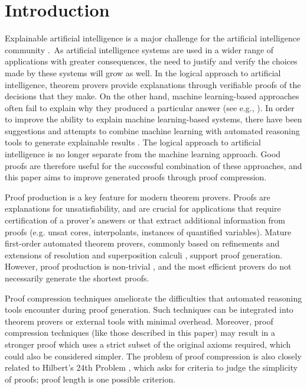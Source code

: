 \section{Introduction} 


Explainable artificial intelligence is a major challenge for the artificial intelligence community \cite{bonacina2017automated}.~As artificial intelligence systems are used in a wider range of applications with greater consequences, the need to justify and verify the choices made by these systems will grow as well.
In the logical approach to artificial intelligence, theorem provers provide explanations through verifiable proofs of the decisions that they make.
On the other hand, machine learning-based approaches often fail to explain why they produced a particular answer (see e.g., \cite{miller2019explanation}). 
In order to improve the ability to explain machine learning-based systems, there have been suggestions and attempts to combine machine learning with automated reasoning tools to generate explainable results \cite{bonacina2017automated,siebert2019corg}. 
The logical approach to artificial intelligence is no longer separate from the machine learning approach.
Good proofs are therefore useful for the successful combination of these approaches, and this paper aims to improve generated proofs through proof compression.

Proof production is a key feature for modern theorem provers. 
Proofs are explanations for unsatisfiability, and are crucial for applications that require certification of a prover's answers or that extract additional information from proofs (e.g. unsat cores, interpolants, instances of quantified variables).
Mature first-order automated theorem provers, commonly based on refinements and extensions of resolution and superposition calculi \cite{Vampire,EProver,Spass,spassT,prover9-mace4}, support proof generation. However, proof production is non-trivial \cite{SchulzAPPA}, and the most efficient provers do not necessarily generate the shortest proofs. 

Proof compression techniques ameliorate the difficulties that automated reasoning tools encounter during proof generation. Such techniques can be integrated into theorem provers or external tools with minimal overhead. Moreover, proof compression techniques (like those described in this paper) may result in a stronger proof which uses a strict subset of the original axioms required, which could also be considered simpler. The problem of proof compression is also closely related to Hilbert's 24th Problem \cite{Hilbert24Problem}, which asks for criteria to judge the simplicity of proofs; proof length is one possible criterion. 


